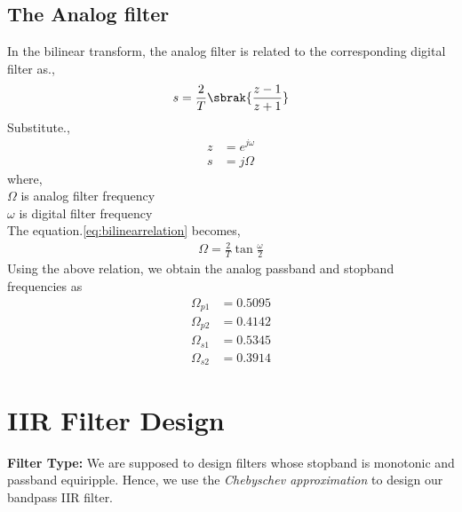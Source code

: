 \documentclass[journal,12pt,twocolumn]{IEEEtran}
\begin{document}
\subsection{The Analog filter}
In the bilinear transform, the analog filter is related to the corresponding digital filter as.,
\begin{align}
    s = \frac{2}{T}\sbrak{\frac{z-1}{z+1}} \label{eq:bilinearrelation}
\end{align}
Substitute.,
\begin{align}
    z &= e^{j\omega}\\
    s &= j\Omega
\end{align}
where,\\ $\Omega$ is analog filter frequency\\
$\omega$ is digital filter frequency\\
The equation.\ref{eq:bilinearrelation} becomes,
\begin{align}
    \Omega  = \frac{2}{T}\tan\frac{\omega}{2}
\end{align}
Using the above relation, we obtain the analog passband and stopband frequencies as
\begin{align}
    \Omega_{p1} &= 0.5095\\
    \Omega_{p2} &= 0.4142\\ \Omega_{s1} &= 0.5345\\ \Omega_{s2} &= 0.3914
\end{align}
\section{IIR Filter Design}
\textbf{Filter Type:} We are supposed to design filters whose stopband is monotonic and passband equiripple.  
Hence, we use the {\em Chebyschev approximation} to design our bandpass IIR filter.
\end{document}
